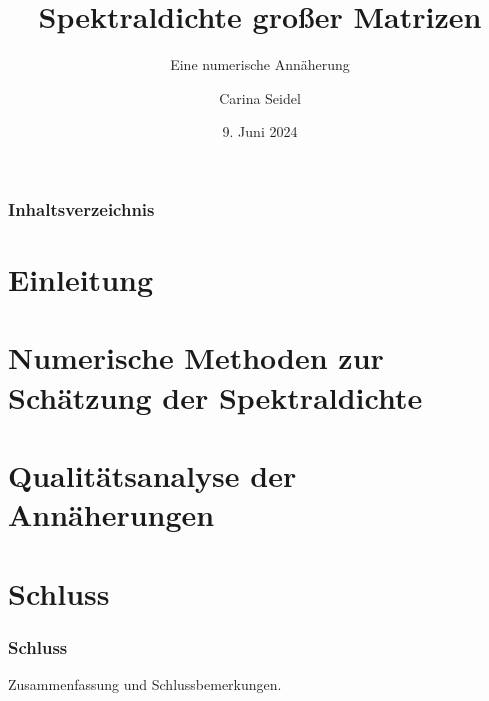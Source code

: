 \documentclass{beamer}
\title{Spektraldichte großer Matrizen}
\subtitle{Eine numerische Annäherung}
\author{Carina Seidel}
\institute[Universität Potsdam]{Universität Potsdam}
\date[9. Juni 2024]{9. Juni 2024}
\newcommand{\1}{\mathds{1}}
\begin{document}
\begin{frame}
\titlepage
\end{frame}
\begin{frame}
\frametitle{Inhaltsverzeichnis}
\tableofcontents
\end{frame}

\section{Einleitung}



\section{Numerische Methoden zur Schätzung der Spektraldichte}



\section{Qualitätsanalyse der Annäherungen}



\section{Schluss}

\begin{frame}
\frametitle{Schluss}
Zusammenfassung und Schlussbemerkungen.
\end{frame}
\end{document}
